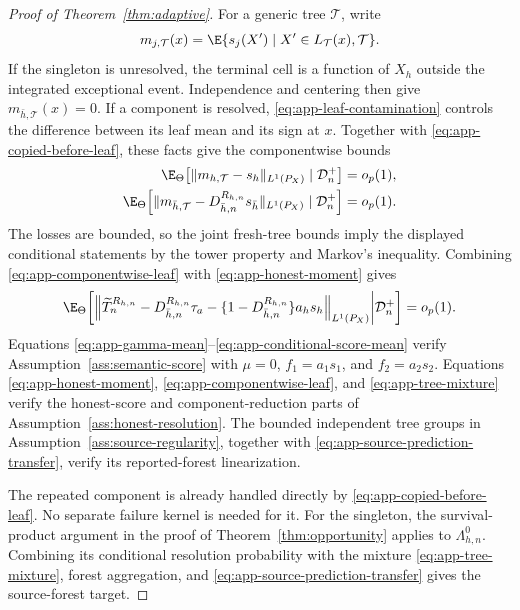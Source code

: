\begin{appendix}
\begin{proof}[Proof of Theorem~\ref{thm:adaptive}]
For a generic tree \(\mathcal T\), write
\[
m_{j,\mathcal T}(x)
=\E\{s_j(X')\mid X'\in L_{\mathcal T}(x),\mathcal T\}.
\]
If the singleton is unresolved, the terminal cell is a function of \(X_h\)
outside the integrated exceptional event. Independence and centering then give
\(m_{\bar h,\mathcal T}(x)=0\). If a component is resolved,
\eqref{eq:app-leaf-contamination} controls the difference between its leaf mean
and its sign at \(x\). Together with \eqref{eq:app-copied-before-leaf}, these
facts give the componentwise bounds
\begin{align}
\E_\Theta\!\left[
\|m_{h,\mathcal T}-s_h\|_{L^1(P_X)}\mid\mathcal D_n^+\right]
&=o_p(1),\notag\\
\E_\Theta\!\left[
\|m_{\bar h,\mathcal T}
-D_{\bar h,n}^{R_{h,n}}s_{\bar h}\|_{L^1(P_X)}
\mid\mathcal D_n^+\right]&=o_p(1).
\label{eq:app-componentwise-leaf}
\end{align}
The losses are bounded, so the joint fresh-tree bounds imply the displayed
conditional statements by the tower property and Markov's inequality. Combining
\eqref{eq:app-componentwise-leaf} with \eqref{eq:app-honest-moment} gives
\begin{equation}\label{eq:app-tree-mixture}
\E_\Theta\!\left[
\left\|
\widetilde T_n^{R_{h,n}}
-D_{\bar h,n}^{R_{h,n}}\tau_a
-\{1-D_{\bar h,n}^{R_{h,n}}\}a_hs_h
\right\|_{L^1(P_X)}\middle|\mathcal D_n^+\right]=o_p(1).
\end{equation}
Equations \eqref{eq:app-gamma-mean}--\eqref{eq:app-conditional-score-mean}
verify Assumption~\ref{ass:semantic-score} with
\(\mu=0\), \(f_1=a_1s_1\), and \(f_2=a_2s_2\). Equations
\eqref{eq:app-honest-moment}, \eqref{eq:app-componentwise-leaf}, and
\eqref{eq:app-tree-mixture} verify the honest-score and component-reduction
parts of Assumption~\ref{ass:honest-resolution}. The bounded independent tree
groups in Assumption~\ref{ass:source-regularity}, together with
\eqref{eq:app-source-prediction-transfer}, verify its reported-forest
linearization.

The repeated component is already handled directly by
\eqref{eq:app-copied-before-leaf}. No separate failure kernel is needed for it.
For the singleton, the survival-product argument in the proof of
Theorem~\ref{thm:opportunity} applies to \(\Lambda_{h,n}^0\). Combining its
conditional resolution probability with the mixture
\eqref{eq:app-tree-mixture}, forest aggregation, and
\eqref{eq:app-source-prediction-transfer} gives the source-forest target.


\end{proof}
\end{appendix}
